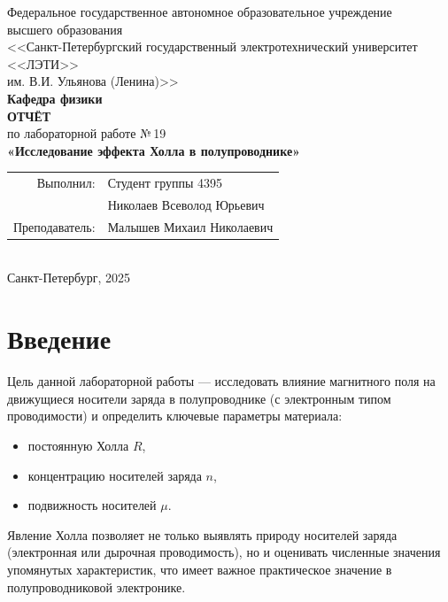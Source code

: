 \documentclass[12pt,a4paper]{article}
\begin{document}
\begin{titlepage}
    \thispagestyle{empty}  %
    \begin{center}
        \large
        Федеральное государственное автономное образовательное учреждение\\
        высшего образования\\
        <<Санкт-Петербургский государственный электротехнический университет <<ЛЭТИ>>\\
        им. В.И. Ульянова (Ленина)>>\\[2em]
        
        \textbf{Кафедра физики}\\[4em]
        
        \textbf{\Large ОТЧЁТ}\\
        по лабораторной работе №\,19\\[1em]
        \textbf{\large «Исследование эффекта Холла в полупроводнике»}\\[4em]
        
        \begin{tabular}{rl}
            Выполнил: & Студент группы 4395 \\
                       & Николаев Всеволод Юрьевич \\[0.5em]
            Преподаватель: & Малышев Михаил Николаевич \\
        \end{tabular}\\[6em]
        
        \vfill
        Санкт-Петербург, 2025
    \end{center}
\end{titlepage}

\tableofcontents
\clearpage

\section{Введение}

Цель данной лабораторной работы --- исследовать влияние магнитного поля на движущиеся носители заряда в полупроводнике (с электронным типом проводимости) и определить ключевые параметры материала:
\begin{itemize}
    \item постоянную Холла $R$,
    \item концентрацию носителей заряда $n$,
    \item подвижность носителей $\mu$.
\end{itemize}
Явление Холла позволяет не только выявлять природу носителей заряда (электронная или дырочная проводимость), но и оценивать численные значения упомянутых характеристик, что имеет важное практическое значение в полупроводниковой электронике.
\end{document}
